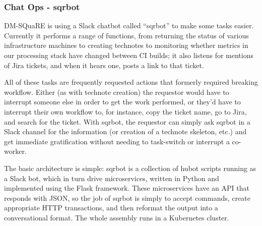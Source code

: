 \subsubsection{Chat Ops - sqrbot}
\label{sec:chatops}

DM-SQuaRE is using a Slack chatbot called ``sqrbot'' to make some tasks
easier. Currently it performs a range of functions, from returning the
status of various infrastructure machines to creating technotes to
monitoring whether metrics in our processing stack have changed between
CI builds; it also listens for mentions of Jira tickets, and when it
hears one, posts a link to that ticket.

All of these tasks are frequently requested actions that formerly
required breaking workflow.  Either (as with technote creation) the
requestor would have to interrupt someone else in order to get the work
performed, or they'd have to interrupt their own workflow to, for
instance, copy the ticket name, go to Jira, and search for the ticket.
With sqrbot, the requestor can simply ask sqrbot in a Slack channel for
the information (or creation of a technote skeleton, etc.) and get
immediate gratification without needing to task-switch or interrupt
a co-worker.

The basic architecture is simple: sqrbot is a collection of hubot
scripts running as a Slack bot, which in turn drive microservices,
written in Python and implemented using the Flask framework.  These
microservices have an API that responds with JSON, so the job of sqrbot
is simply to accept commands, create appropriate HTTP transactions, and
then reformat the output into a conversational format.  The whole
assembly runs in a Kubernetes cluster.
